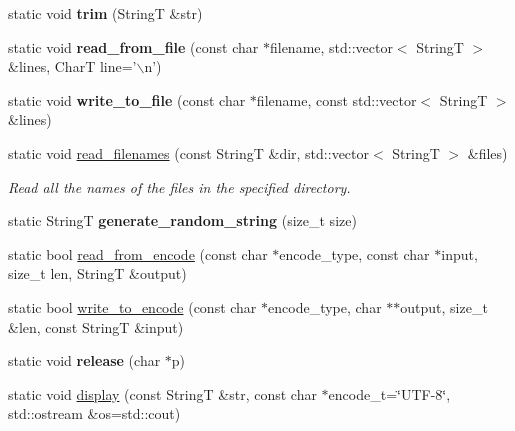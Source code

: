 \begin{CompactItemize}
\item 
\hypertarget{classAlgorithm_bde58525e896a9335411f68393f87d10}{
static void \textbf{trim} (StringT \&str)}
\label{classAlgorithm_bde58525e896a9335411f68393f87d10}

\item 
\hypertarget{classAlgorithm_c4fed76db6affd3bfa4217b1bf57744e}{
static void \textbf{read\_\-from\_\-file} (const char $\ast$filename, std::vector$<$ StringT $>$ \&lines, CharT line='$\backslash$n')}
\label{classAlgorithm_c4fed76db6affd3bfa4217b1bf57744e}

\item 
\hypertarget{classAlgorithm_a2b2c0788b3dbb1521eae8685478aa2e}{
static void \textbf{write\_\-to\_\-file} (const char $\ast$filename, const std::vector$<$ StringT $>$ \&lines)}
\label{classAlgorithm_a2b2c0788b3dbb1521eae8685478aa2e}

\item 
static void \hyperlink{classAlgorithm_7f3d9af1b1567546161c773696660c5f}{read\_\-filenames} (const StringT \&dir, std::vector$<$ StringT $>$ \&files)
\begin{CompactList}\small\item\em Read all the names of the files in the specified directory. \item\end{CompactList}\item 
\hypertarget{classAlgorithm_fa3287000daf77817025b444b951af77}{
static StringT \textbf{generate\_\-random\_\-string} (size\_\-t size)}
\label{classAlgorithm_fa3287000daf77817025b444b951af77}

\item 
static bool \hyperlink{classAlgorithm_f51c5e010fd029995daabff0ba2dd224}{read\_\-from\_\-encode} (const char $\ast$encode\_\-type, const char $\ast$input, size\_\-t len, StringT \&output)
\item 
static bool \hyperlink{classAlgorithm_71b0e9191bc505859f1b6d4d50cb9a16}{write\_\-to\_\-encode} (const char $\ast$encode\_\-type, char $\ast$$\ast$output, size\_\-t \&len, const StringT \&input)
\item 
\hypertarget{classAlgorithm_2089d52191fd52e7cf0d6574ad72212b}{
static void \textbf{release} (char $\ast$p)}
\label{classAlgorithm_2089d52191fd52e7cf0d6574ad72212b}

\item 
static void \hyperlink{classAlgorithm_1bda1a6c7890a94c5b5e3a687965bfe4}{display} (const StringT \&str, const char $\ast$encode\_\-t=\char`\"{}UTF-8\char`\"{}, std::ostream \&os=std::cout)
\end{CompactItemize}


